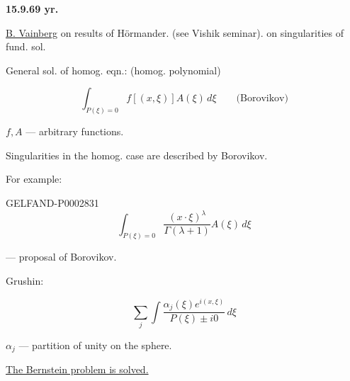 \textbf{15.9.69 yr.}

\underline{\underline{B. Vainberg}} on results of Hörmander. (see Vishik seminar). on singularities of fund. sol.

General sol. of homog. eqn.: (homog. polynomial)

\begin{equation*}\int_{P (\xi)=0}f[(x,\xi)]A (\xi)\, d\xi\qquad\text{(Borovikov)}\end{equation*}

$f, A$ — arbitrary functions.

Singularities in the homog. case are described by Borovikov.

For example:

\begin{GelfandAdjacentEvidence}{GELFAND-P000283}{1}
\begin{equation*}\int_{P (\xi)=0}\frac{(x\cdot\xi)^\lambda}{\Gamma (\lambda+1)}A (\xi)\, d\xi\end{equation*}

\end{GelfandAdjacentEvidence}


— proposal of Borovikov.

\begin{center}\end{center}





Grushin:

\begin{equation*}\sum_j\int\frac{\alpha_j (\xi)e^{i (x,\xi)}}{P (\xi)\pm i0}\, d\xi\end{equation*}

$\alpha_j$ — partition of unity on the sphere.





\underline{The Bernstein problem is solved.}


